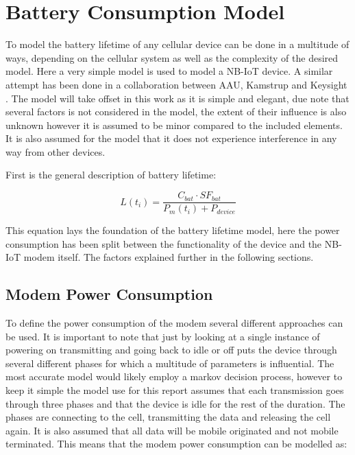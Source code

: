\section{Battery Consumption Model}
\label{app:bat_model}

To model the battery lifetime of any cellular device can be done in a multitude of ways, depending on the cellular system as well as the complexity of the desired model. Here a very simple model is used to model a NB-IoT device. A similar attempt has been done in a collaboration between AAU, Kamstrup and Keysight \citep{Power_article}. The model will take offset in this work as it is simple and elegant, due note that several factors is not considered in the model, the extent of their influence is also unknown however it is assumed to be minor compared to the included elements. It is also assumed for the model that it does not experience interference in any way from other devices.

First is the general description of battery lifetime:

\begin{equation}
L(t_i) = \frac{C_{bat}\cdot SF_{bat}}{P_m(t_i) + P_{device}}
\end{equation}
\begin{where}
\end{where}

This equation lays the foundation of the battery lifetime model, here the power consumption has been split between the functionality of the device and the NB-IoT modem itself. The factors explained further in the following sections.

\subsection{Modem Power Consumption}

To define the power consumption of the modem several different approaches can be used. It is important to note that just by looking at a single instance of powering on transmitting and going back to idle or off puts the device through several different phases for which a multitude of parameters is influential. The most accurate model would likely employ a markov decision process, however to keep it simple the model use for this report assumes that each transmission goes through three phases and that the device is idle for the rest of the duration. The phases are connecting to the cell, transmitting the data and releasing the cell again. It is also assumed that all data will be mobile originated and not mobile terminated. This means that the modem power consumption can be modelled as:

